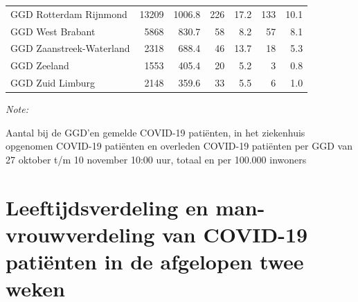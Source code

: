 \documentclass[
  english,
  man,floatsintext]{apa6}
\begin{document}
\begin{table}[H]
\begin{threeparttable}
\begin{tabular}{lrrrrrr}
GGD Rotterdam Rijnmond & 13209 & 1006.8 & 226 & 17.2 & 133 & 10.1\\
GGD West Brabant & 5868 & 830.7 & 58 & 8.2 & 57 & 8.1\\
GGD Zaanstreek-Waterland & 2318 & 688.4 & 46 & 13.7 & 18 & 5.3\\
GGD Zeeland & 1553 & 405.4 & 20 & 5.2 & 3 & 0.8\\
GGD Zuid Limburg & 2148 & 359.6 & 33 & 5.5 & 6 & 1.0\\
\bottomrule
\end{tabular}
\begin{tablenotes}
\item \textit{Note: } 
\item Aantal bij de GGD’en gemelde COVID-19 patiënten, in het ziekenhuis opgenomen COVID-19 patiënten en overleden COVID-19 patiënten per GGD van 27 oktober t/m 10 november 10:00 uur, totaal en per 100.000 inwoners
\end{tablenotes}
\end{threeparttable}
\endgroup{}
\end{table}

\newpage

\hypertarget{leeftijdsverdeling-en-man-vrouwverdeling-van-covid-19-patiuxebnten-in-de-afgelopen-twee-weken}{%
\section{Leeftijdsverdeling en man-vrouwverdeling van COVID-19 patiënten in de afgelopen twee weken}\label{leeftijdsverdeling-en-man-vrouwverdeling-van-covid-19-patiuxebnten-in-de-afgelopen-twee-weken}}
\end{document}
